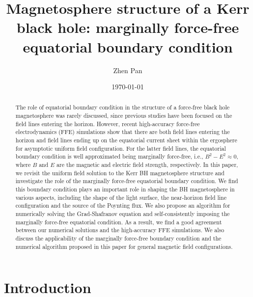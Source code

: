 \documentclass[aps,prd,reprint,nofootinbib, superscriptaddress]{revtex4-1}
\begin{document}
\title{Magnetosphere structure of a Kerr black hole:
marginally force-free equatorial boundary condition}
\author{Zhen Pan}

\date{\today}

\begin{abstract}
    The role of equatorial boundary condition in the structure of
    a force-free black hole magnetosphere was rarely discussed, since previous studies have been focused on the
    field lines entering the horizon. However,
    recent high-accuracy force-free electrodynamics (FFE) simulations \cite{East2018}
    show that there are both field lines entering the horizon and field lines ending up on
    the equatorial current sheet within the ergosphere for asymptotic uniform field configuration.
    For the latter field lines, the equatorial boundary
    condition is well approximated being marginally force-free, i.e., $B^2-E^2\approx 0$, where $B$ and
    $E$ are the magnetic and electric field strength, respectively. In this paper, we revisit the uniform field
    solution to the Kerr BH magnetosphere structure and investigate the role of the marginally force-free
    equatorial boundary condition.  We find this boundary condition plays an important role in
    shaping the BH magnetosphere in various aspects, including the shape of the light surface, the near-horizon field
    line configuration and the source of the Poynting flux.
    We also propose an algorithm for numerically solving the Grad-Shafranov equation and self-consistently imposing the marginally force-free equatorial
    condition. As a result, we find a good agreement between our numerical solutions and the high-accuracy FFE simulations.
    We also discuss the applicability of the marginally force-free boundary condition and the numerical algorithm
    proposed in this paper for general magnetic field configurations.
\end{abstract}


\maketitle

\section{Introduction}
\end{document}
